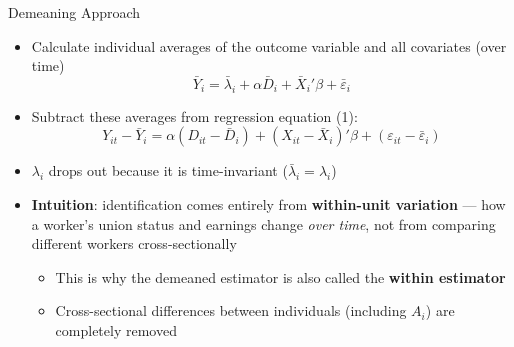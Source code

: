 \documentclass[dvipsnames,hyperref={pdfpagelabels=false}]{beamer}
\begin{document}
\begin{frame}{Demeaning Approach}{}
	\begin{itemize}
		\item[1] Calculate individual averages of the outcome variable and all covariates (over time)
		\begin{equation*}
			\bar{Y}_{i}=\bar{\lambda}_{i}+\alpha\bar{D}_{i}+\bar{X}_i'\beta+\bar{\varepsilon}_i
		\end{equation*}

		\item[2] Subtract these averages from regression equation (1):
		\begin{equation*}
			Y_{it}-\bar{Y}_{i}=\alpha(D_{it}-\bar{D}_i)+(X_{it}-\bar{X}_{i})'\beta+(\varepsilon_{it}-\bar{\varepsilon}_i)
		\end{equation*}

		\item $\lambda_i$ drops out because it is time-invariant ($\bar{\lambda}_i = \lambda_i$)
		\vspace{0.2cm}
		\item \textbf{Intuition}: identification comes entirely from \textbf{within-unit variation} — how a worker's union status and earnings change \textit{over time}, not from comparing different workers cross-sectionally
		\vspace{0.2cm}
		\begin{itemize}
			\item This is why the demeaned estimator is also called the \textbf{within estimator}
			\vspace{0.2cm}
			\item Cross-sectional differences between individuals (including $A_i$) are completely removed
		\end{itemize}
	\end{itemize}
\end{frame}
\end{document}

